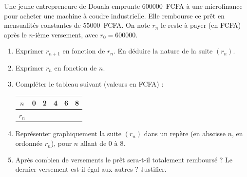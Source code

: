 \documentclass[11pt]{article}
\begin{document}
\begin{exercice}
Une jeune entrepreneure de Douala emprunte \SI{600000}{FCFA} à une microfinance pour acheter une machine à coudre industrielle. Elle rembourse ce prêt en mensualités constantes de \SI{55000}{FCFA}. On note $r_n$ le reste à payer (en FCFA) après le $n$-ième versement, avec $r_0 = 600000$.
\begin{enumerate}
\item Exprimer $r_{n+1}$ en fonction de $r_n$. En déduire la nature de la suite $(r_n)$.
\item Exprimer $r_n$ en fonction de $n$.
\item Compléter le tableau suivant (valeurs en FCFA) :
\begin{center}
\begin{tabular}{|c|c|c|c|c|c|}
\hline
$n$ & 0 & 2 & 4 & 6 & 8 \\
\hline
$r_n$ & & & & & \\
\hline
\end{tabular}
\end{center}
\item Représenter graphiquement la suite $(r_n)$ dans un repère (en abscisse $n$, en ordonnée $r_n$), pour $n$ allant de 0 à 8.
\item Après combien de versements le prêt sera-t-il totalement remboursé ? Le dernier versement est-il égal aux autres ? Justifier.
\end{enumerate}
\end{exercice}
\end{document}
